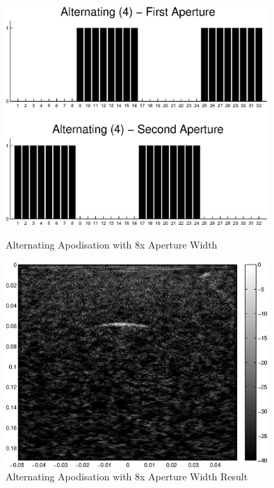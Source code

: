 \begin{figure}[htbp]
\centering
		\includegraphics[width=100mm]{Alternating4.eps}
		\caption{Alternating Apodisation with 8x Aperture Width}
		\label{fig:apod8}

		\includegraphics[width=100mm]{08_SAC.eps}
		\caption{Alternating Apodisation with 8x Aperture Width Result}
		\label{fig:apod8_result}
\end{figure}


